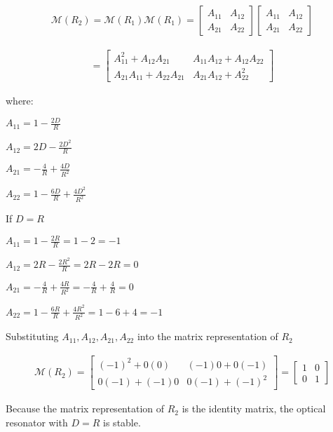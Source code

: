 \documentclass[fleqn]{article}
\begin{document}
\begin{enumerate}[nolistsep]
			\begin{align*}
				\mathcal{M}(R_2) = \mathcal{M}(R_1)\mathcal{M}(R_1) = \begin{bmatrix}A_{11} & A_{12}\\ A_{21} & A_{22}\end{bmatrix}\begin{bmatrix}A_{11} & A_{12}\\ A_{21} & A_{22}\end{bmatrix}
			\end{align*}
			
			\begin{align*}
				= \begin{bmatrix}A_{11}^2 + A_{12}A_{21} & A_{11}A_{12} + A_{12}A_{22}\\ A_{21}A_{11} + A_{22}A_{21} & A_{21}A_{12} + A_{22}^2\end{bmatrix}
			\end{align*}
			
			where:
			
			$A_{11} = 1 - \frac{2D}{R}$
			
			$A_{12} = 2D - \frac{2D^2}{R}$
			
			$A_{21} = -\frac{4}{R} + \frac{4D}{R^2}$
			
			$A_{22} = 1 - \frac{6D}{R} + \frac{4D^2}{R^2}$
			
			\pagebreak			
			If $D = R$
			
			$A_{11} = 1 - \frac{2R}{R} = 1 - 2 = -1$
			
			$A_{12} = 2R - \frac{2R^2}{R} = 2R - 2R = 0$
			
			$A_{21} = -\frac{4}{R} + \frac{4R}{R^2} = -\frac{4}{R} + \frac{4}{R} = 0$
			
			$A_{22} = 1 - \frac{6R}{R} + \frac{4R^2}{R^2} = 1 - 6 + 4 = -1$
			
			Substituting $A_{11}, A_{12}, A_{21}, A_{22}$ into the matrix representation of $R_2$
			
			\begin{align*}
				\mathcal{M}(R_2) = \begin{bmatrix}(-1)^2 + 0(0) & (-1)0 + 0(-1)\\ 0(-1) + (-1)0 & 0(-1) + (-1)^2\end{bmatrix} = \begin{bmatrix}1 & 0\\ 0 & 1\end{bmatrix}
			\end{align*}
			
			Because the matrix representation of $R_2$ is the identity matrix, the optical resonator with $D=R$ is stable.
			
	\end{enumerate}
\end{document}
